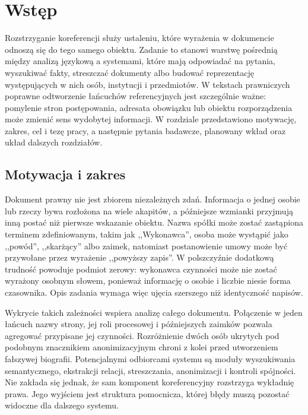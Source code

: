 \chapter{Wstęp}
\label{chap:wstep}

Rozstrzyganie koreferencji służy ustaleniu, które wyrażenia w dokumencie odnoszą się do tego samego obiektu. Zadanie to stanowi warstwę pośrednią między analizą językową a systemami, które mają odpowiadać na pytania, wyszukiwać fakty, streszczać dokumenty albo budować reprezentację występujących w nich osób, instytucji i przedmiotów. W tekstach prawniczych poprawne odtworzenie łańcuchów referencyjnych jest szczególnie ważne: pomylenie stron postępowania, adresata obowiązku lub obiektu rozporządzenia może zmienić sens wydobytej informacji. W rozdziale przedstawiono motywację, zakres, cel i tezę pracy, a następnie pytania badawcze, planowany wkład oraz układ dalszych rozdziałów.

\section{Motywacja i zakres}
\label{sec:motywacja-zakres}

Dokument prawny nie jest zbiorem niezależnych zdań. Informacja o jednej osobie lub rzeczy bywa rozłożona na wiele akapitów, a późniejsze wzmianki przyjmują inną postać niż pierwsze wskazanie obiektu. Nazwa spółki może zostać zastąpiona terminem zdefiniowanym, takim jak ,,Wykonawca'', osoba może wystąpić jako ,,powód'', ,,skarżący'' albo zaimek, natomiast postanowienie umowy może być przywołane przez wyrażenie ,,powyższy zapis''. W polszczyźnie dodatkową trudność powoduje podmiot zerowy: wykonawca czynności może nie zostać wyrażony osobnym słowem, ponieważ informację o osobie i liczbie niesie forma czasownika. Opis zadania wymaga więc ujęcia szerszego niż identyczność napisów.

Wykrycie takich zależności wspiera analizę całego dokumentu. Połączenie w jeden łańcuch nazwy strony, jej roli procesowej i późniejszych zaimków pozwala agregować przypisane jej czynności. Rozróżnienie dwóch osób ukrytych pod podobnym znacznikiem anonimizacyjnym chroni z kolei przed utworzeniem fałszywej biografii. Potencjalnymi odbiorcami systemu są moduły wyszukiwania semantycznego, ekstrakcji relacji, streszczania, anonimizacji i kontroli spójności. Nie zakłada się jednak, że sam komponent koreferencyjny rozstrzyga wykładnię prawa. Jego wyjściem jest struktura pomocnicza, której błędy muszą pozostać widoczne dla dalszego systemu.

